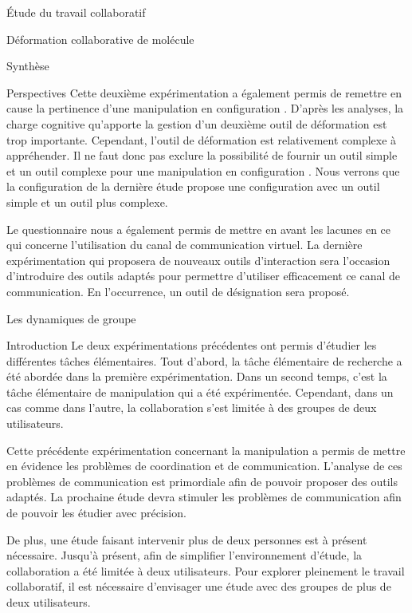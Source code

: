 \documentclass[myfrancais]{mythesis}
\begin{document}
\begin{mypart}{Étude du travail collaboratif}
\begin{mychapter}{Déformation collaborative de molécule}
\begin{mysection}{Synthèse}
\begin{mysubsection}{Perspectives}
					Cette deuxième expérimentation a également permis de remettre en cause la pertinence d'une manipulation en configuration .
					D'après les analyses, la charge cognitive qu'apporte la gestion d'un deuxième outil de déformation est trop importante.
					Cependant, l'outil de déformation est relativement complexe à appréhender.
					Il ne faut donc pas exclure la possibilité de fournir un outil simple et un outil complexe pour une manipulation en configuration .
					Nous verrons que la configuration de la dernière étude  propose une configuration  avec un outil simple et un outil plus complexe.

					Le questionnaire nous a également permis de mettre en avant les lacunes en ce qui concerne l'utilisation du canal de communication virtuel.
					La dernière expérimentation qui proposera de nouveaux outils d'interaction sera l'occasion d'introduire des outils adaptés pour permettre d'utiliser efficacement ce canal de communication.
					En l'occurrence, un outil de désignation sera proposé.
				\end{mysubsection}
			\end{mysection}
		\end{mychapter}
		\begin{mychapter}{Les dynamiques de groupe}
			\begin{mysection}{Introduction}
				Le deux expérimentations précédentes ont permis d'étudier les différentes tâches élémentaires.
				Tout d'abord, la tâche élémentaire de recherche a été abordée dans la première expérimentation.
				Dans un second temps, c'est la tâche élémentaire de manipulation qui a été expérimentée.
				Cependant, dans un cas comme dans l'autre, la collaboration s'est limitée à des groupes de deux utilisateurs.

				Cette précédente expérimentation concernant la manipulation a permis de mettre en évidence les problèmes de coordination et de communication.
				L'analyse de ces problèmes de communication est primordiale afin de pouvoir proposer des outils adaptés.
				La prochaine étude devra stimuler les problèmes de communication afin de pouvoir les étudier avec précision.

				De plus, une étude faisant intervenir plus de deux personnes est à présent nécessaire.
				Jusqu'à présent, afin de simplifier l'environnement d'étude, la collaboration a été limitée à deux utilisateurs.
				Pour explorer pleinement le travail collaboratif, il est nécessaire d'envisager une étude avec des groupes de plus de deux utilisateurs.


\end{mysection}
\end{mychapter}
\end{mypart}
\end{document}
